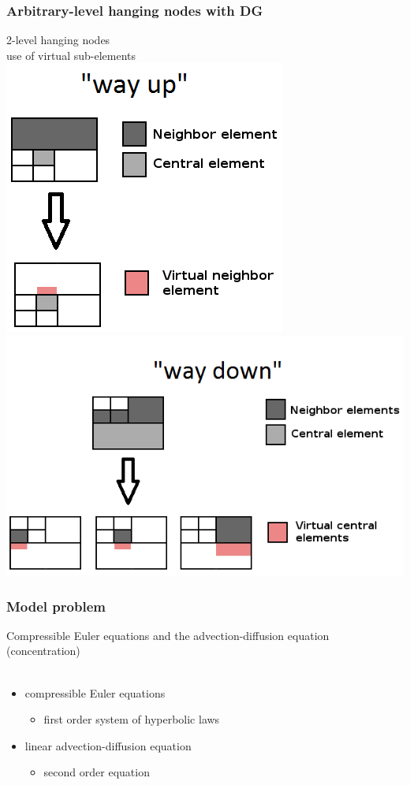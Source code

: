 \documentclass{beamer}
\begin{document}
\begin{frame}
\frametitle{Arbitrary-level hanging nodes with DG}
\begin{center}
2-level hanging nodes\\
use of virtual sub-elements\\
\includegraphics[width=0.45\textheight]{way_up2.png}
\hspace{4mm}
\includegraphics[width=0.8\textheight]{way_down2.png}
\end{center}
\end{frame}

\begin{frame}
\frametitle{Model problem}
Compressible Euler equations and the advection-diffusion equation (concentration)\\\ \\
\begin{itemize}
\item
compressible Euler equations\ \\
\begin{itemize}
\item
first order system of hyperbolic laws\ \\
\end{itemize}
\item linear advection-diffusion equation
\begin{itemize}
\item second order equation
\end{itemize}
\end{itemize}
\end{frame}
\end{document}
